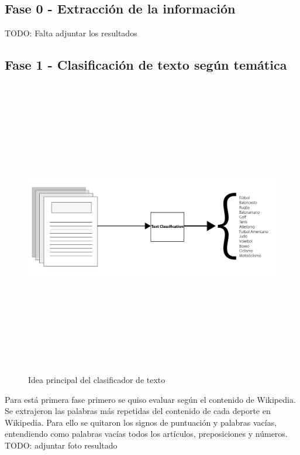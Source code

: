 \documentclass[../all.tex]{subfiles}
\begin{document}
\newpage
\subsection{Fase 0 - Extracción de la información}
	{\color{red} 
		TODO: Falta adjuntar los resultados
	}

\newpage
\subsection{Fase 1 - Clasificación de texto según temática}


\begin{figure}[H]
    \centering
    \includegraphics[height=13cm, width=15cm]{imgs/textClassification.png}
    \caption{Idea principal del clasificador de texto}
\end{figure}


Para está primera fase primero se quiso evaluar según el contenido de Wikipedia. Se extrajeron las palabras más repetidas del contenido de cada deporte en Wikipedia. Para ello se quitaron los signos de puntuación y palabras vacías, entendiendo como palabras vacías todos los artículos, preposiciones y números. {\color{red} TODO: adjuntar foto resultado}\\
\end{document}
